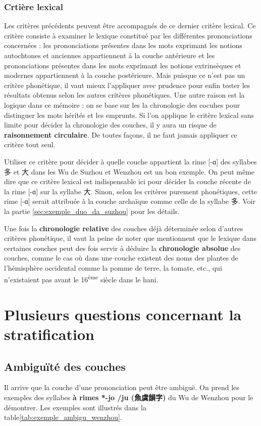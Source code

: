 \documentclass{scrbook}
\newcounter{c}[subsubsection]
\newcommand{\illustre}{Les exemples sont illustrés dans la table\xspace}
\newcommand{\termyyx}[1]{\textbf{#1}}
\begin{document}
\begin{sloppypar}
\subsection{Crtière lexical}
Les critères précédents peuvent être accompagnés de ce dernier critère lexical. Ce critère consiste à examiner le lexique constitué par les différentes prononciations concernées : les prononciations présentes dans les mots exprimant les notions autochtones et anciennes appartiennent à la couche antérieure et les prononciations présentes dans les mots exprimant les notions extrinsèques et modernes appartiennent à la couche postérieure. Mais puisque ce n'est pas un critère phonétique, il vaut mieux l'appliquer avec prudence pour enfin tester les résultats obtenus selon les autres critères phonétiques. Une autre raison est la logique dans ce mémoire : on se base sur les la chronologie des cocuhes pour distinguer les mots hérités et les emprunts. Si l'on applique le critère lexical sans limite pour décider la chronologie des couches, il y aura un risque de \textbf{raisonnement circulaire}. De toutes façons, il ne faut jamais appliquer ce critère tout seul.

Utiliser ce critère pour décider à quelle couche appartient la rime [-ɑ] des syllabes 多 et 大 dans les Wu de Suzhou et Wenzhou est un bon exemple. On peut même dire que ce critère lexical est indispensable ici pour décider la couche récente de la rime [-ɑ] sur la syllabe 大. Sinon, selon les critères purement phonétiques, cette rime [-ɑ] serait attribuée à la couche archaïque comme celle de la syllabe 多.  Voir la partie \ref{sec:exemple_duo_da_suzhou} pour les détails.

Une fois la \textbf{chronologie relative} des couches déjà déterminée selon d'autres critères phonétique, il vaut la peine de noter que \textcite[17]{Sagart2001hani} mentionnent que le lexique dans certaines couches peut des fois servir à déduire la \textbf{chronologie absolue} des couches, comme le cas où dans une couche existent des noms des plantes de l'hémisphère occidental comme la pomme de terre, la tomate, etc., qui n'existaient pas avant le 16\textsuperscript{ème} siècle dans le hani.

\chapter{Plusieurs questions concernant la stratification}\label{question_strat}

\section{Ambiguïté des couches}\label{ambigu}
Il arrive que la couche d'une prononciation peut être ambiguë. On prend les exemples des syllabes \termyyx{à rimes *-jo /ju (魚虞韻字)} du Wu de Wenzhou pour le démontrer. \illustre \ref{tab:exemple_ambigu_wenzhou}.


\end{sloppypar}
\end{document}
